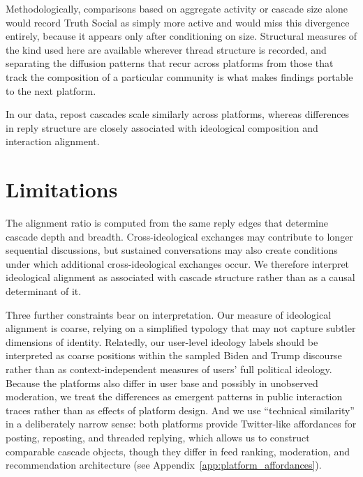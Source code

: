 \documentclass[letterpaper]{article} %
\newcommand{\rev}[1]{{\color{blue}#1}}
\begin{document}
\rev{Methodologically, comparisons based on aggregate activity or cascade size alone would record Truth Social as simply more active and would miss this divergence entirely, because it appears only after conditioning on size. Structural measures of the kind used here are available wherever thread structure is recorded, and separating the diffusion patterns that recur across platforms from those that track the composition of a particular community is what makes findings portable to the next platform.} 


\rev{In our data, repost cascades scale similarly across platforms, whereas differences in reply structure are closely associated with ideological composition and interaction alignment.}

\section{\rev{Limitations}}

\rev{The alignment ratio is computed from the same reply edges that determine cascade depth and breadth. Cross-ideological exchanges may contribute to longer sequential discussions, but sustained conversations may also create conditions under which additional cross-ideological exchanges occur. We therefore interpret ideological alignment as associated with cascade structure rather than as a causal determinant of it.}

Three further constraints bear on interpretation. Our measure of ideological alignment is coarse, relying on a simplified typology that may not capture subtler dimensions of identity. \rev{Relatedly, our user-level ideology labels should be interpreted as coarse positions within the sampled Biden and Trump discourse rather than as context-independent measures of users' full political ideology.} \rev{Because the platforms also differ in user base and possibly in unobserved moderation, we treat the differences as emergent patterns in public interaction traces rather than as effects of platform design.} And we use ``technical similarity'' in a deliberately narrow sense: both platforms provide Twitter-like affordances for posting, reposting, and threaded replying, which allows us to construct comparable cascade objects, though they differ in feed ranking, moderation, and recommendation architecture (see Appendix~\ref{app:platform_affordances}).
\end{document}
